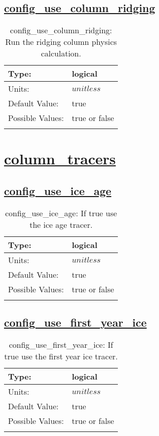\subsection[config\_use\_column\_ridging]{\hyperref[sec:nm_tab_column_package]{config\_use\_column\_ridging}}
\label{subsec:nm_sec_config_use_column_ridging}
\begin{center}
\begin{longtable}{| p{2.0in} || p{4.0in} |}
    \hline
    Type: & logical \\
    \hline
    Units: & $unitless$ \\
    \hline
    Default Value: & true \\
    \hline
    Possible Values: & true or false \\
    \hline
    \caption{config\_use\_column\_ridging: Run the ridging column physics calculation.}
\end{longtable}
\end{center}
\section[column\_tracers]{\hyperref[sec:nm_tab_column_tracers]{column\_tracers}}
\label{sec:nm_sec_column_tracers}
\subsection[config\_use\_ice\_age]{\hyperref[sec:nm_tab_column_tracers]{config\_use\_ice\_age}}
\label{subsec:nm_sec_config_use_ice_age}
\begin{center}
\begin{longtable}{| p{2.0in} || p{4.0in} |}
    \hline
    Type: & logical \\
    \hline
    Units: & $unitless$ \\
    \hline
    Default Value: & true \\
    \hline
    Possible Values: & true or false \\
    \hline
    \caption{config\_use\_ice\_age: If true use the ice age tracer.}
\end{longtable}
\end{center}
\subsection[config\_use\_first\_year\_ice]{\hyperref[sec:nm_tab_column_tracers]{config\_use\_first\_year\_ice}}
\label{subsec:nm_sec_config_use_first_year_ice}
\begin{center}
\begin{longtable}{| p{2.0in} || p{4.0in} |}
    \hline
    Type: & logical \\
    \hline
    Units: & $unitless$ \\
    \hline
    Default Value: & true \\
    \hline
    Possible Values: & true or false \\
    \hline
    \caption{config\_use\_first\_year\_ice: If true use the first year ice tracer.}
\end{longtable}
\end{center}
